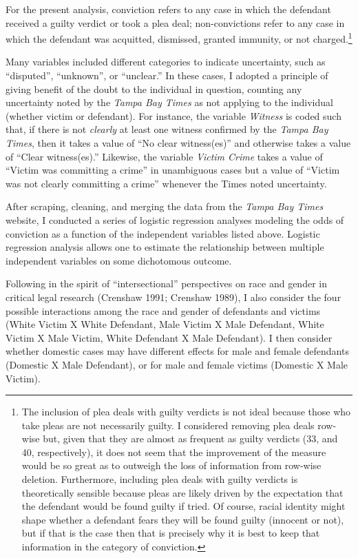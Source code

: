 \documentclass[12pt,article]{article}
\begin{document}
For the present analysis, conviction refers to any case in which the
defendant received a guilty verdict or took a plea deal; non-convictions
refer to any case in which the defendant was acquitted, dismissed,
granted immunity, or not charged.\footnote{The inclusion of plea deals
  with guilty verdicts is not ideal because those who take pleas are not
  necessarily guilty. I considered removing plea deals row-wise but,
  given that they are almost as frequent as guilty verdicts (33, and 40,
  respectively), it does not seem that the improvement of the measure
  would be so great as to outweigh the loss of information from row-wise
  deletion. Furthermore, including plea deals with guilty verdicts is
  theoretically sensible because pleas are likely driven by the
  expectation that the defendant would be found guilty if tried. Of
  course, racial identity might shape whether a defendant fears they
  will be found guilty (innocent or not), but if that is the case then
  that is precisely why it is best to keep that information in the
  category of conviction.}

Many variables included different categories to indicate uncertainty,
such as ``disputed'', ``unknown'', or ``unclear.'' In these cases, I
adopted a principle of giving benefit of the doubt to the individual in
question, counting any uncertainty noted by the \emph{Tampa Bay Times}
as not applying to the individual (whether victim or defendant). For
instance, the variable \emph{Witness} is coded such that, if there is
not \emph{clearly} at least one witness confirmed by the \emph{Tampa Bay
Times}, then it takes a value of ``No clear witness(es)'' and otherwise
takes a value of ``Clear witness(es).'' Likewise, the variable
\emph{Victim Crime} takes a value of ``Victim was committing a crime''
in unambiguous cases but a value of ``Victim was not clearly committing
a crime'' whenever the Times noted uncertainty.

After scraping, cleaning, and merging the data from the \emph{Tampa Bay
Times} website, I conducted a series of logistic regression analyses
modeling the odds of conviction as a function of the independent
variables listed above. Logistic regression analysis allows one to
estimate the relationship between multiple independent variables on some
dichotomous outcome.

Following in the spirit of ``intersectional'' perspectives on race and
gender in critical legal research (Crenshaw 1991; Crenshaw 1989), I also
consider the four possible interactions among the race and gender of
defendants and victims (White Victim X White Defendant, Male Victim X
Male Defendant, White Victim X Male Victim, White Defendant X Male
Defendant). I then consider whether domestic cases may have different
effects for male and female defendants (Domestic X Male Defendant), or
for male and female victims (Domestic X Male Victim).
\end{document}
